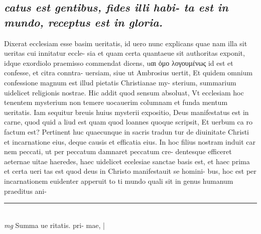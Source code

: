 \documentclass{article}
\begin{document}
\begin{pages}
\subsection*{\textit{catus est gentibus, fides illi habi- ta est in mundo, receptus est in gloria. }}\pstart Dixerat ecclesiam esse basim ueritatis, id uero nunc explicans quae nam illa sit ueritas cui innitatur eccle- sia et quam certa quantaeue sit authoritas exponit, idque exordiolo praemisso commendat dicens, uαι ὀμο λογουμένως id est et confesse, et citra conntra- uersiam, siue ut Ambrosius uertit, Et quidem omnium confessione magnum est illud pietatis Christianae my- sterium, summarium uidelicet religionis nostrae. Hic addit quod sensum absoluat, Vt ecclesiam hoc tenentem mysterium non temere uocauerim columnam et funda mentum ueritatis. Iam sequitur breuis huius mysterii expositio, Deus manifestatus est in carne, quod quid a liud est quam quod loannes quoque scripsit, Et uerbum ca ro factum est? Pertinent huc quaecunque in sacris tradun tur de diuinitate Christi et incarnatione eius, deque  causis et efficatia eius. In hoc filius nostram induit car nem peccati, ut per peccatum damnaret peccatum cre- dentesque efficeret aeternae uitae haeredes, haec uidelicet ecelesiae sanctae basis est, et haec prima et certa ueri tas est quod deus in Christo manifestauit se homini- bus, hoc est per incarnationem euidenter apperuit to ti mundo quali sit in genus humanum praeditus ani-  \pend
\vspace{0.5cm}\noindent
\vspace{0.2cm}\rule{1cm}{0.2pt}\\ 
\hspace{0.2cm}\textit{mg}
\footnotesize Summa ue ritatis. pri- mae, 
\normalsize| 

\end{pages}
\end{document}

